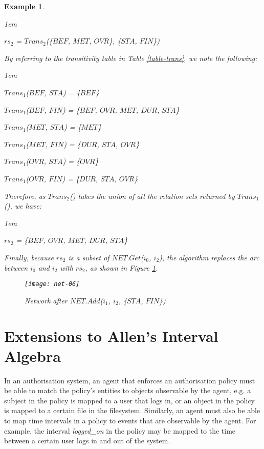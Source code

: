 \documentclass[11pt]{report}
\newtheorem{vexample}{Example}[chapter]
\newenvironment{vquote}
{
  \begin{list}{}{\leftmargin 1em}\item[]
}
{
  \end{list}
}
\begin{document}
\begin{vexample}
\begin{vquote}
              $rs_2$ = $Trans_2$(\{$BEF$, $MET$, $OVR$\}, \{$STA$, $FIN$\})
            \end{vquote}

            By referring to the transitivity table in Table \ref{table-trans},
            we note the following:

            \begin{vquote}
              $Trans_1$($BEF$, $STA$) = \{$BEF$\}

              $Trans_1$($BEF$, $FIN$) = \{$BEF$, $OVR$, $MET$, $DUR$, $STA$\}

              $Trans_1$($MET$, $STA$) = \{$MET$\}

              $Trans_1$($MET$, $FIN$) = \{$DUR$, $STA$, $OVR$\}

              $Trans_1$($OVR$, $STA$) = \{$OVR$\}

              $Trans_1$($OVR$, $FIN$) = \{$DUR$, $STA$, $OVR$\}
            \end{vquote}

            Therefore, as $Trans_2$() takes the union of all the relation sets
            returned by $Trans_1$(), we have:

            \begin{vquote}
              $rs_2$ = \{$BEF$, $OVR$, $MET$, $DUR$, $STA$\}
            \end{vquote}

            Finally, because $rs_2$ is a subset of $NET.Get$($i_0$, $i_2$), the
            algorithm replaces the arc between $i_0$ and $i_2$ with $rs_2$, as
            shown in Figure \ref{fig-net-ex-06}.

            \begin{figure}[tbhp]
              \begin{center}
                \texttt{[image: net-06]}
                \caption{Network after $NET.Add$($i_1$, $i_2$, \{$STA$, $FIN$\})}
                \label{fig-net-ex-06}
              \end{center}
            \end{figure}
          \end{vexample}

    \section{Extensions to Allen's Interval Algebra}

      In an authorisation system, an agent that enforces an authorisation
      policy must be able to match the policy's entities to objects observable
      by the agent, e.g. a subject in the policy is mapped to a user that logs
      in, or an object in the policy is mapped to a certain file in the
      filesystem. Similarly, an agent must also be able to map time intervals
      in a policy to events that are observable by the agent. For example,
      the interval {\em logged\_on} in the policy may be mapped to the time
      between a certain user logs in and out of the system.
\end{document}
